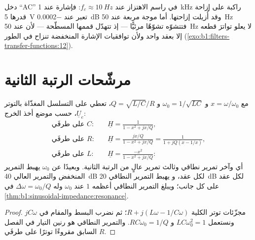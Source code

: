 \begin{example}\label{ex:b1:filters-transfer-functions:accoupling}
دخل ``AC'' في راسم الاهتزاز  عند $f_c \approx \qty{10}{Hz}$:
فإشارة عند \qty{1}{kHz} راكبة على إزاحة قدرها \qty{5}{V} تعبر عند
\qty{-0.0002}{dB} وقد أُزيلت إزاحتها. أما موجة مربعة عند \qty{50}{Hz}
فتتشوّه تشوّهًا مرئيًّا --- إذ تتهدّل قممها المسطّحة --- لأن  عند
\qty{50}{Hz} لا يعلو تواترَ قطعه إلا بعقد واحد ولأن توافقيات الإشارة
المنخفضة تنزاح في الطور
(\cref{exo:b1:filters-transfer-functions:12}).
\end{example}

\section{مرشّحات الرتبة الثانية}

\begin{proposition}\label{prop:b1:filters-transfer-functions:rlc}
مع $x = \omega/\omega_0$ و $\omega_0 = 1/\sqrt{LC}$ و $Q =
\sqrt{L/C}/R$، تعطي  على التسلسل المغذّاة بالتوتر $\underline U_e$، حسب
موضع أخذ الخرج:
\begin{align*}
\text{على طرفَي } C:&\quad \underline H = \frac{1}{1 - x^2 + jx/Q}, \\
\text{على طرفَي } R:&\quad \underline H = \frac{jx/Q}{1 - x^2 + jx/Q} = \frac{1}{1 + jQ(x - 1/x)}, \\
\text{على طرفَي } L:&\quad \underline H = \frac{-x^2}{1 - x^2 + jx/Q}:
\end{align*}
أي  وآخر تمرير نطاقي وثالث تمرير عالٍ من الرتبة الثانية. وبعيدًا عن
$\omega_0$ يهبط التمرير المنخفض والتمرير العالي \qty{40}{dB} لكل عقد، و
يهبط التمرير النطاقي \qty{20}{dB} لكل عقد على كل جانب؛ ويبلغ التمرير النطاقي
أعظمه $1$ عند $\omega_0$ وله  $\Delta\omega =
\omega_0/Q$ في \cref{thm:b1:sinusoidal-impedance:resonance}.
\end{proposition}

\begin{proof}
مجزّئات توتر  الكلية $R + j(L\omega - 1/C\omega)$؛
ثم نضرب البسط والمقام في $jC\omega$ ونستعمل
$LC\omega_0^2 = 1$ و $RC\omega_0 = 1/Q$. والتمرير النطاقي هو رنين
التيار في الفصل السابق مقروءًا توترًا على طرفَي $R$.
\end{proof}

